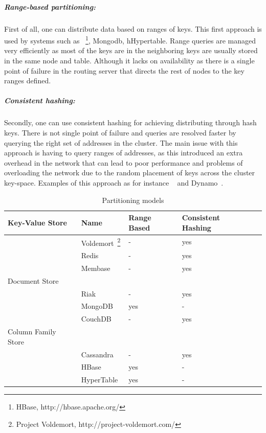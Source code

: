 	\subparagraph{Range-based partitioning:}
	First of all, one can distribute data based on ranges of keys. This first approach is used by systems such as ~\footnote{HBase, http://hbase.apache.org/}, Mongodb, hHypertable. Range queries are managed very efficiently as most of the keys are in the neighboring keys are usually stored in the same node  and table. Although it lacks on availability as there is a single point of failure in the routing server that directs the rest of nodes to the key ranges defined.
		
	\subparagraph{Consistent hashing:}
	Secondly, one can use consistent hashing for achieving distributing through hash keys. There is not single point of failure and queries are resolved faster by querying the right set of addresses in the cluster. The main issue with this approach is having to query ranges of addresses, as this introduced an extra overhead in the network that can lead to poor performance and problems of overloading the network due to the random placement of keys across the cluster key-space. Examples of this approach as for instance ~\cite{Lakshman:2010} and Dynamo~\cite{DeCandia:2007}.
	
\begin{table}[b]
		\begin{center}
    			\begin{tabular}{ | p{5cm} | l | l | l | l |}
   			\hline
			Key-Value Store & Name & Range Based & Consistent Hashing \\ \hline   		
			 & Voldemort~\footnote{Project Voldemort, http://project-voldemort.com/} & - & yes \\ \hline
			 & Redis~\cite{} & - & yes \\ \hline
			 & Membase~\cite{} & - & yes \\ \hline
			
			Document Store &  &  &  \\ \hline
			 & Riak~\cite{} & - & yes \\ \hline			
			 & MongoDB~\cite{} & yes & - \\ \hline
			 & CouchDB~\cite{} & - & yes \\ \hline
			Column Family Store &  & \\ \hline
			 & Cassandra & - & yes \\ \hline
			 & HBase~\cite{} & yes & - \\ \hline
			 & HyperTable~\cite{} & yes & - \\ \hline
    			\end{tabular}
		\end{center}
		\caption{Partitioning models}
		\label{table:partitioning}
		\end{table}	
	
